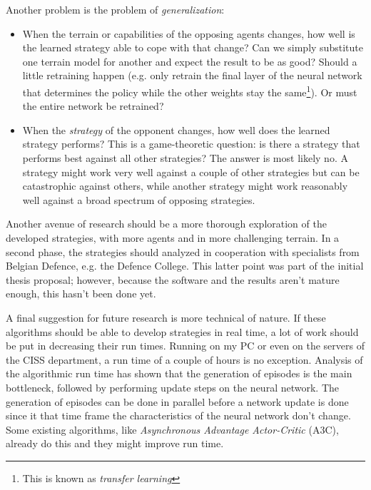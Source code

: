 Another problem is the problem of \emph{generalization}:
\begin{itemize}
    \item When the terrain or capabilities of the opposing agents changes, how well is the learned strategy able to cope with that change? Can we simply substitute one terrain model for another and expect the result to be as good? Should a little retraining happen (e.g. only retrain the final layer of the neural network that determines the policy while the other weights stay the same\footnote{This is known as \emph{transfer learning}}). Or must the entire network be retrained?
    \item When the \emph{strategy} of the opponent changes, how well does the learned strategy performs? This is a game-theoretic question: is there a strategy that performs best against all other strategies? The answer is most likely no. A strategy might work very well against a couple of other strategies but can be catastrophic against others, while another strategy might work reasonably well against a broad spectrum of opposing strategies.
\end{itemize}

Another avenue of research should be a more thorough exploration of the developed strategies, with more agents and in more challenging terrain. In a second phase, the strategies should analyzed in cooperation with specialists from Belgian Defence, e.g. the Defence College. This latter point was part of the initial thesis proposal; however, because the software and the results aren't mature enough, this hasn't been done yet.

A final suggestion for future research is more technical of nature. If these algorithms should be able to develop strategies in real time, a lot of work should be put in decreasing their run times. Running on my PC or even on the servers of the CISS department, a run time of a couple of hours is no exception. Analysis of the algorithmic run time has shown that the generation of episodes is the main bottleneck, followed by performing update steps on the neural network. The generation of episodes can be done in parallel before a network update is done since it that time frame the characteristics of the neural network don't change. Some existing algorithms, like \emph{Asynchronous Advantage Actor-Critic} (A3C)\cite{mnih2016asynchronous}, already do this and they might improve run time.
